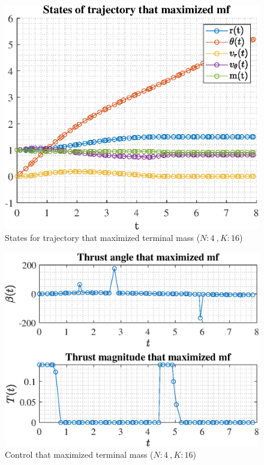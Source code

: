 \documentclass[]{article}
\begin{document}
	\begin{figure}
		\centering
		\includegraphics[scale=0.75]{states_N4_K16_C2_mf.eps}
		\caption{States for trajectory that maximized terminal mass (\(N:4\ , K:16\))}
		\label{fig:states_N4_K16_C2_mf}
	\end{figure}
	\begin{figure}
		\centering
		\includegraphics[scale=0.75]{control_N4_K16_C2_mf.eps}
		\caption{Control that maximized terminal mass (\(N:4\ , K:16\))}
		\label{fig:control_N4_K16_C2_mf}
	\end{figure}
\end{document}
